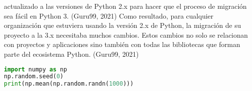 actualizado a las versiones de Python 2.x para hacer que el proceso de migración sea fácil
en Python 3. (Guru99, 2021)
Como resultado, para cualquier organización que estuviera usando la versión 2.x de Python,
la migración de su proyecto a la 3.x necesitaba muchos cambios. Estos cambios no solo se
relacionan con proyectos y aplicaciones sino también con todas las bibliotecas que forman
parte del ecosistema Python. (Guru99, 2021)

\begin{lstlisting}[language=Python, caption={Ejemplo numpy}]
import numpy as np
np.random.seed(0)
print(np.mean(np.random.randn(1000)))
\end{lstlisting}